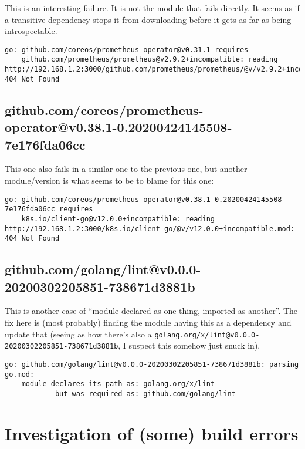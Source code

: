 \documentclass[a4paper]{paper}
\begin{document}
This is an interesting failure. It is not the module that fails
directly. It seems as if a transitive dependency stops it from
downloading before it gets as far as being introspectable.

\begin{verbatim}
go: github.com/coreos/prometheus-operator@v0.31.1 requires
	github.com/prometheus/prometheus@v2.9.2+incompatible: reading http://192.168.1.2:3000/github.com/prometheus/prometheus/@v/v2.9.2+incompatible.mod: 404 Not Found
\end{verbatim}

\subsection{github.com/coreos/prometheus-operator@v0.38.1-0.20200424145508-7e176fda06cc}

This one also fails in a similar one to the previous one, but another module/version is what seems to be to blame for this one:

\begin{verbatim}
go: github.com/coreos/prometheus-operator@v0.38.1-0.20200424145508-7e176fda06cc requires
	k8s.io/client-go@v12.0.0+incompatible: reading http://192.168.1.2:3000/k8s.io/client-go/@v/v12.0.0+incompatible.mod: 404 Not Found
\end{verbatim}

\subsection{github.com/golang/lint@v0.0.0-20200302205851-738671d3881b}

This is another case of ``module declared as one thing, imported as
another''. The fix here is (most probably) finding the module having
this as a dependency and update that (seeing as how there's also a
{\tt golang.org/x/lint@v0.0.0-20200302205851-738671d3881b}, I suspect
this somehow just snuck in).

\begin{verbatim}
go: github.com/golang/lint@v0.0.0-20200302205851-738671d3881b: parsing go.mod:
	module declares its path as: golang.org/x/lint
	        but was required as: github.com/golang/lint
\end{verbatim}

\section{Investigation of (some) build errors}
\end{document}

